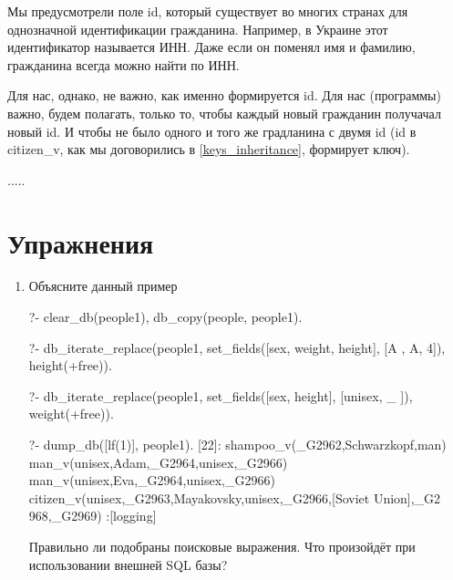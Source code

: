 \documentclass[a4paper]{book}
\begin{document}
Мы предусмотрели поле id, который существует во многих странах
для однозначной идентификации гражданина. Например, в Украине
этот идентификатор называется ИНН. Даже если он поменял имя и
фамилию, гражданина всегда можно найти по ИНН.

Для нас, однако, не важно, как именно формируется id. Для нас
(программы) важно, будем полагать, только то, чтобы каждый новый
гражданин получачал новый id. И чтобы не было одного и того же
градланина с двумя id (id в citizen_v, как мы договорились в
\ref{keys_inheritance}, формирует ключ).

.....

\section{Упражнения}

\begin{enumerate}
\item Объясните данный пример

\begin{example}{}{}
?- clear_db(people1), db_copy(people, people1).

?- db_iterate_replace(people1, set_fields([sex, weight, height], [A
, A, 4]), height(+free)).                                         

?- db_iterate_replace(people1, set_fields([sex, height], [unisex, _
]), weight(+free)).                                               

?- dump_db([lf(1)], people1).
[22]: shampoo_v(_G2962,Schwarzkopf,man) 
man_v(unisex,Adam,_G2964,unisex,_G2966) 
man_v(unisex,Eva,_G2964,unisex,_G2966) 
citizen_v(unisex,_G2963,Mayakovsky,unisex,_G2966,[Soviet Union],_G2
968,_G2969)                                                       
 :[logging]
\end{example}

Правильно ли подобраны поисковые выражения. Что произойдёт при
использовании внешней SQL базы?

\end{enumerate}
\end{document}
